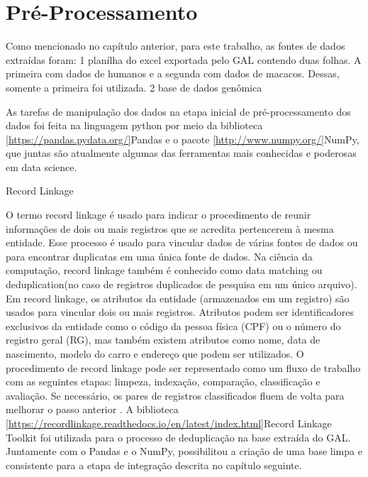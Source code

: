 ﻿\chapter{Pré-Processamento}


Como mencionado no capítulo anterior, para este trabalho, as fontes de dados extraídas foram:
1 planílha do excel exportada pelo GAL contendo duas folhas. A primeira com dados de humanos e a segunda com dados de macacos. Dessas, somente a primeira foi utilizada.
2 base de dados genômica


As tarefas de manipulação dos dados na etapa inicial de pré-processamento dos dados foi feita na linguagem python por meio da biblioteca \ref{https://pandas.pydata.org/}{Pandas} e o pacote \ref{http://www.numpy.org/}{NumPy}, que juntas são atualmente algumas das ferramentas mais conhecidas e poderosas em data science.

Record Linkage

O termo record linkage é usado para indicar o procedimento de reunir informações de dois ou mais registros que se acredita pertencerem à mesma entidade.
Esse processo é usado para vincular dados de várias fontes de dados ou para encontrar duplicatas em uma única fonte de dados.
Na ciência da computação, record linkage também é conhecido como data matching ou deduplication(no caso de registros duplicados de pesquisa em um único arquivo).
Em record linkage, os atributos da entidade (armazenados em um registro) são usados para vincular dois ou mais registros.
Atributos podem ser identificadores exclusivos da entidade como o código da pessoa física (CPF) ou o número do registro geral (RG), mas também existem atributos como nome, data de nascimento, modelo do carro e endereço que podem ser utilizados.
O procedimento de record linkage pode ser representado como um fluxo de trabalho com as seguintes etapas: limpeza, indexação, comparação, classificação e avaliação. Se necessário, os pares de registros classificados fluem de volta para melhorar o passo anterior \cite{christen2012data}.
A biblioteca \ref{https://recordlinkage.readthedocs.io/en/latest/index.html}{Record Linkage Toolkit} foi utilizada para o processo de deduplicação na base extraída do GAL. Juntamente com o Pandas e o NumPy, possibilitou a criação de uma base limpa e consistente para a etapa de integração descrita no capítulo seguinte.